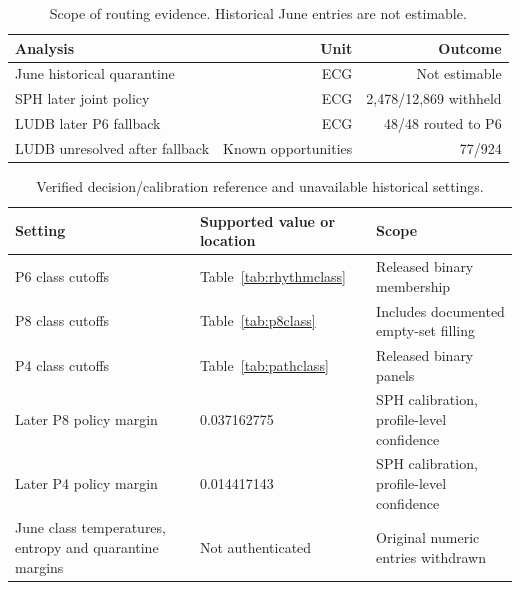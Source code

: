 \documentclass[life,article,submit,moreauthors]{Definitions/mdpi}
\begin{document}




\begin{table}[htbp]
\caption{Scope of routing evidence. Historical June entries are not estimable.\label{tab:app_quarantine_transitions}}
\centering\small
\begin{tabular}{lrr}
\toprule
Analysis & Unit & Outcome \\
\midrule
June historical quarantine & ECG & Not estimable \\
SPH later joint policy & ECG & 2,478/12,869 withheld \\
LUDB later P6 fallback & ECG & 48/48 routed to P6 \\
LUDB unresolved after fallback & Known opportunities & 77/924 \\
\bottomrule
\end{tabular}
\end{table}


\begin{table}[tbp]
\caption{Verified decision/calibration reference and unavailable historical settings.\label{tab:app_calibration_reference}}
\centering\small
\begin{tabular}{@{}p{.31\linewidth}p{.30\linewidth}p{.31\linewidth}@{}}
\toprule
Setting & Supported value or location & Scope \\
\midrule
P6 class cutoffs & Table~\ref{tab:rhythmclass} & Released binary membership \\
P8 class cutoffs & Table~\ref{tab:p8class} & Includes documented empty-set filling \\
P4 class cutoffs & Table~\ref{tab:pathclass} & Released binary panels \\
Later P8 policy margin & 0.037162775 & SPH calibration, profile-level confidence \\
Later P4 policy margin & 0.014417143 & SPH calibration, profile-level confidence \\
June class temperatures, entropy and quarantine margins & Not authenticated & Original numeric entries withdrawn \\
\bottomrule
\end{tabular}
\end{table}


\end{document}
